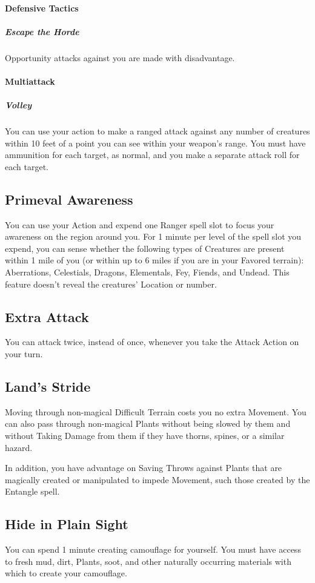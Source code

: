 \documentclass[letterpaper,openany,oneside,twocolumn]{book}
\begin{document}
\paragraph*{Defensive Tactics}
\subparagraph*{Escape the Horde}
Opportunity attacks against you are made with disadvantage.
\paragraph*{Multiattack}
\subparagraph*{Volley}
You can use your action to make a ranged attack against any number of creatures within 10 feet of a point you can see within your weapon's range. You must have ammunition for each target, as normal, and you make a separate attack roll for each target.

\subsection*{Primeval Awareness}
You can use your Action and expend one Ranger spell slot to focus your awareness on the region around you. For 1 minute per level of the spell slot you expend, you can sense whether the following types of Creatures are present within 1 mile of you (or within up to 6 miles if you are in your Favored terrain): Aberrations, Celestials, Dragons, Elementals, Fey, Fiends, and Undead. This feature doesn't reveal the creatures' Location or number.

\subsection*{Extra Attack}
You can attack twice, instead of once, whenever you take the Attack Action on your turn.

\subsection*{Land's Stride}
Moving through non-magical Difficult Terrain costs you no extra Movement. You can also pass through non-magical Plants without being slowed by them and without Taking Damage from them if they have thorns, spines, or a similar hazard.

In addition, you have advantage on Saving Throws against Plants that are magically created or manipulated to impede Movement, such those created by the Entangle spell.

\subsection*{Hide in Plain Sight}
You can spend 1 minute creating camouflage for yourself. You must have access to fresh mud, dirt, Plants, soot, and other naturally occurring materials with which to create your camouflage.
\end{document}
